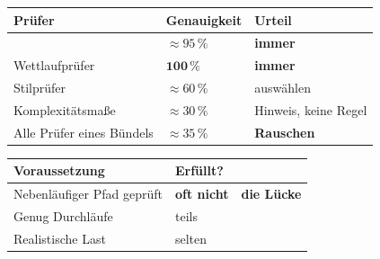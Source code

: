 \begin{aufgabe}
\begin{center}
{\small
\renewcommand{\arraystretch}{1.45}
\begin{tabular}{@{}P{3.0cm}P{2.2cm}P{2.6cm}@{}}
\toprule
\textbf{Prüfer} & \textbf{Genauigkeit} & \textbf{Urteil}\\
\midrule
{} & \textcolor{gruen}{$\approx95\,\%$} & \textcolor{gruen}{\textbf{immer}}\\
Wettlaufprüfer & \textcolor{gruen}{$\mathbf{100\,\%}$} & \textcolor{gruen}{\textbf{immer}}\\
Stilprüfer & \textcolor{mittel}{$\approx60\,\%$} & \textcolor{mittel}{auswählen}\\
Komplexitätsmaße & \textcolor{akzent}{$\approx30\,\%$} & \textcolor{akzent}{Hinweis, keine Regel}\\
Alle Prüfer eines Bündels & \textcolor{akzent}{$\approx35\,\%$} & \textcolor{akzent}{\textbf{Rauschen}}\\
\bottomrule
\end{tabular}}
\end{center}

\begin{center}
\begin{minipage}{0.88\textwidth}
\end{minipage}
\end{center}

\begin{center}
\end{center}

\begin{warnung}
\begin{center}
\renewcommand{\arraystretch}{1.5}
\begin{tabular}{@{}P{3.0cm}P{2.2cm}P{2.8cm}@{}}
\toprule
\textbf{Voraussetzung} & \textbf{Erfüllt?} & \\
\midrule
Nebenläufiger Pfad geprüft & \textcolor{mittel}{\textbf{oft nicht}} & \textcolor{akzent}{\textbf{die Lücke}}\\
Genug Durchläufe & \textcolor{mittel}{teils} & \\
Realistische Last & \textcolor{akzent}{selten} & \\
\bottomrule
\end{tabular}
\end{center}


\end{warnung}
\end{aufgabe}
